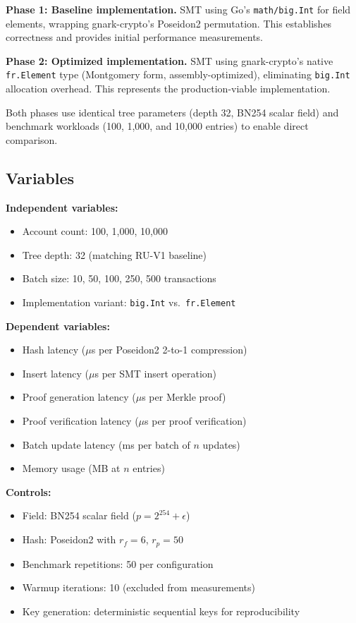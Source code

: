 \textbf{Phase 1: Baseline implementation.} SMT using Go's
\texttt{math/big.Int} for field elements, wrapping gnark-crypto's
Poseidon2 permutation. This establishes correctness and provides
initial performance measurements.

\textbf{Phase 2: Optimized implementation.} SMT using gnark-crypto's
native \texttt{fr.Element} type (Montgomery form, assembly-optimized),
eliminating \texttt{big.Int} allocation overhead. This represents the
production-viable implementation.

Both phases use identical tree parameters (depth 32, BN254 scalar
field) and benchmark workloads (100, 1,000, and 10,000 entries)
to enable direct comparison.

\subsection{Variables}

\textbf{Independent variables:}
\begin{itemize}
  \item Account count: 100, 1,000, 10,000
  \item Tree depth: 32 (matching RU-V1 baseline)
  \item Batch size: 10, 50, 100, 250, 500 transactions
  \item Implementation variant: \texttt{big.Int} vs.\ \texttt{fr.Element}
\end{itemize}

\textbf{Dependent variables:}
\begin{itemize}
  \item Hash latency ($\mu$s per Poseidon2 2-to-1 compression)
  \item Insert latency ($\mu$s per SMT insert operation)
  \item Proof generation latency ($\mu$s per Merkle proof)
  \item Proof verification latency ($\mu$s per proof verification)
  \item Batch update latency (ms per batch of $n$ updates)
  \item Memory usage (MB at $n$ entries)
\end{itemize}

\textbf{Controls:}
\begin{itemize}
  \item Field: BN254 scalar field ($p = 2^{254} + \epsilon$)
  \item Hash: Poseidon2 with $r_f = 6$, $r_p = 50$
  \item Benchmark repetitions: 50 per configuration
  \item Warmup iterations: 10 (excluded from measurements)
  \item Key generation: deterministic sequential keys for
    reproducibility
\end{itemize}

